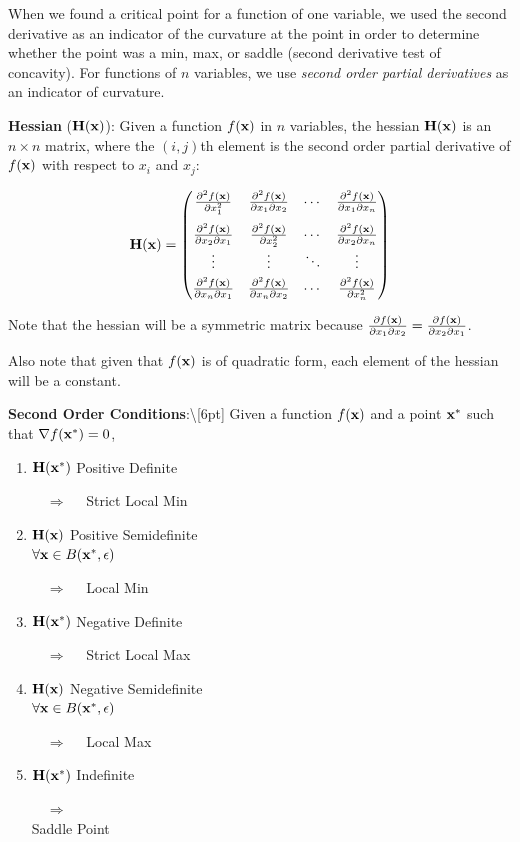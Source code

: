 \documentclass[]{book}
\newcommand{\fx}{f({\bf x})}
\theoremstyle{definition}
\theoremstyle{definition}
\theoremstyle{definition}
\theoremstyle{remark}
\begin{document}
When we found a critical point for a function of one variable, we used
the second derivative as an indicator of the curvature at the point in
order to determine whether the point was a min, max, or saddle (second
derivative test of concavity). For functions of \(n\) variables, we use
\textit{second order partial derivatives} as an indicator of curvature.

\textbf{Hessian} (\({\bf H(x)}\)): Given a function \(f({\bf x})\) in
\(n\) variables, the hessian \({\bf H(x)}\) is an \(n\times n\) matrix,
where the \((i,j)\)th element is the second order partial derivative of
\(f({\bf x})\) with respect to \(x_i\) and \(x_j\):

\[{\bf H(x)}=\begin{pmatrix}
\frac{\partial^2 \fx}{\partial x_1^2}&\frac{\partial^2\fx}{\partial x_1 \partial x_2}&
\cdots & \frac{\partial^2 \fx}{\partial x_1 \partial x_n}\\[9pt]
\frac{\partial^2 \fx}{\partial x_2 \partial x_1}&\frac{\partial^2\fx}{\partial x_2^2}&
\cdots & \frac{\partial^2 \fx}{\partial x_2 \partial x_n}\\
\vdots & \vdots & \ddots & \vdots \\[3pt]
\frac{\partial^2 \fx}{\partial x_n \partial x_1}&\frac{\partial^2\fx}{\partial x_n \partial x_2}&
\cdots & \frac{\partial^2 \fx}{\partial x_n^2}\end{pmatrix}\]

Note that the hessian will be a symmetric matrix because
\(\frac{\partial \fx}{\partial x_1\partial x_2} = \frac{\partial \fx}{\partial x_2\partial x_1}\).

Also note that given that \(\fx\) is of quadratic form, each element of
the hessian will be a constant.

\smallskip

\textbf{Second Order Conditions}:\textbackslash{}{[}6pt{]} Given a
function \(\fx\) and a point \({\bf x}^*\) such that
\(\nabla f({\bf x}^*)=0\),

\begin{enumerate}
  \item \parbox[t]{2in}{$\bf H(x^*)$ Positive Definite} $\quad \Longrightarrow \quad$
  Strict Local Min
  \item \parbox[t]{2in}{$\bf H(x)$ Positive Semidefinite\\ $\forall {\bf x}\in
B({\bf x}^*,\epsilon)$} $\quad \Longrightarrow \quad$
  Local Min
  \item \parbox[t]{2in}{$\bf H(x^*)$ Negative Definite} $\quad \Longrightarrow \quad$
  Strict Local Max
  \item \parbox[t]{2in}{$\bf H(x)$ Negative Semidefinite\\ $\forall {\bf x}\in
B({\bf x}^*,\epsilon)$} $\quad \Longrightarrow \quad$
  Local Max
  \item \parbox[t]{2in}{$\bf H(x^*)$ Indefinite} $\quad \Longrightarrow \quad$\\
  Saddle Point
\end{enumerate}
\end{document}

